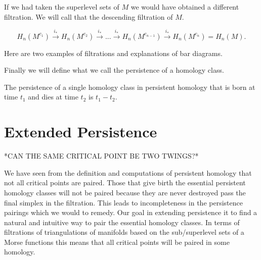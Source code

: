 If we had taken the superlevel sets of $M$ we would have obtained a different filtration. We will call that the descending filtration of $M$.

$$ H_n(M^{c_1}) \overset{i_*}{\longrightarrow} H_n(M^{c_2}) \overset{i_*}{\longrightarrow} ... \overset{i_*}{\longrightarrow} H_n(M^{c_{n-1}}) \overset{i_*}{\longrightarrow} H_n(M^{c_n}) = H_n(M).$$


Here are two examples of filtrations and explanations of bar diagrams.


Finally we will define what we call the persistence of a homology class.

\begin{defn} The persistence of a single homology class in persistent homology that is born at time $t_1$ and dies at time $t_2$ is $t_1 - t_2$.  \end{defn}








\section{Extended Persistence}

*CAN THE SAME CRITICAL POINT BE TWO TWINGS?*

We have seen from the definition and computations of persistent homology that not all critical points are paired. Those that give birth the essential persistent homology classes will not be paired because they are never destroyed pass the final simplex in the filtration. This leads to incompleteness in the persistence pairings which we would to remedy. Our goal in extending persistence it to find a natural and intuitive way to pair the essential homology classes. In terms of filtrations of triangulations of manifolds based on the sub/superlevel sets of a Morse functions this means that all critical points will be paired in some homology.

